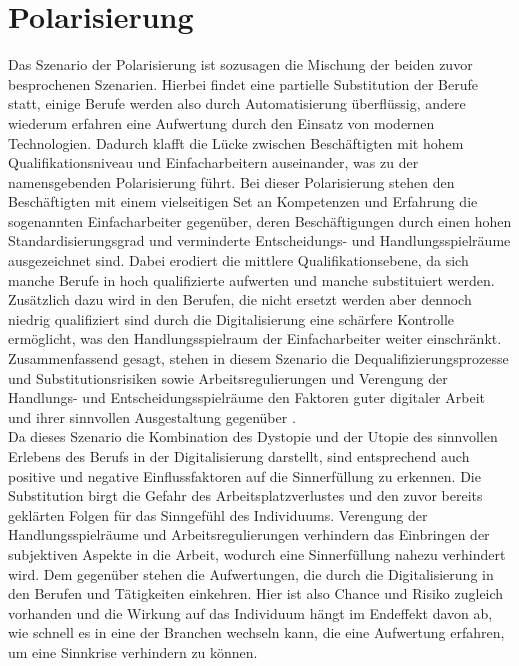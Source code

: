 \section{Polarisierung}
Das Szenario der Polarisierung ist sozusagen die Mischung der beiden zuvor besprochenen Szenarien. Hierbei findet eine partielle Substitution der Berufe statt, einige Berufe werden also durch Automatisierung überflüssig, andere wiederum erfahren eine Aufwertung durch den Einsatz von modernen Technologien. Dadurch klafft die Lücke zwischen Beschäftigten mit hohem Qualifikationsniveau und Einfacharbeitern auseinander, was zu der namensgebenden Polarisierung führt. Bei dieser Polarisierung stehen den Beschäftigten mit einem vielseitigen Set an Kompetenzen und Erfahrung die sogenannten Einfacharbeiter gegenüber, deren Beschäftigungen durch einen hohen Standardisierungsgrad und verminderte Entscheidungs- und Handlungsspielräume ausgezeichnet sind. Dabei erodiert die mittlere Qualifikationsebene, da sich manche Berufe in hoch qualifizierte aufwerten und manche substituiert werden. Zusätzlich dazu wird in den Berufen, die nicht ersetzt werden aber dennoch niedrig qualifiziert sind durch die Digitalisierung eine schärfere Kontrolle ermöglicht, was den Handlungsspielraum der Einfacharbeiter weiter einschränkt. Zusammenfassend gesagt, stehen in diesem Szenario die Dequalifizierungsprozesse und Substitutionsrisiken sowie Arbeitsregulierungen und Verengung der Handlungs- und Entscheidungsspielräume den Faktoren guter digitaler Arbeit und ihrer sinnvollen Ausgestaltung gegenüber \cite[S.183-184]{Eisenmann.2018}.\\

Da dieses Szenario die Kombination des Dystopie und der Utopie des sinnvollen Erlebens des Berufs in der Digitalisierung darstellt, sind entsprechend auch positive und negative Einflussfaktoren auf die Sinnerfüllung zu erkennen. Die Substitution birgt die Gefahr des Arbeitsplatzverlustes und den zuvor bereits geklärten Folgen für das Sinngefühl des Individuums. Verengung der Handlungsspielräume und Arbeitsregulierungen verhindern das Einbringen der subjektiven Aspekte in die Arbeit, wodurch eine Sinnerfüllung nahezu verhindert wird. Dem gegenüber stehen die Aufwertungen, die durch die Digitalisierung in den Berufen und Tätigkeiten einkehren. Hier ist also Chance und Risiko zugleich vorhanden und die Wirkung auf das Individuum hängt im Endeffekt davon ab, wie schnell es in eine der Branchen wechseln kann, die eine Aufwertung erfahren, um eine Sinnkrise verhindern zu können.
